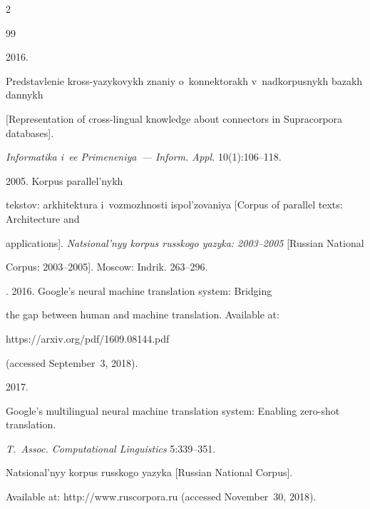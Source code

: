 \begin{multicols}{2}
{{\begin{thebibliography}{99}


 2016. 


Predstavlenie kross-yazykovykh znaniy o~konnektorakh v~nadkorpusnykh bazakh dannykh 


[Representation of cross-lingual knowledge about connectors in Supracorpora databases]. 


\textit{Informatika i~ee Primeneniya~--- Inform. Appl.} 10(1):106--118.




 2005. Korpus parallel'nykh 


tekstov: arkhitektura i~voz\-mozh\-nosti ispol'zovaniya [Corpus of parallel texts: Architecture and 


applications]. \textit{Natsional'nyy korpus russkogo yazyka: 2003--2005} [Russian National 


Corpus: 2003--2005]. Moscow: Indrik. 263--296.




. 2016. Google's neural machine translation system: Bridging 


the gap between human and machine translation. Available at: {\sf 


https://arxiv.org/pdf/1609.08144.pdf} (accessed September~3, 2018).




 2017. 


Google's multilingual neural machine translation system: Enabling zero-shot translation. 


\textit{T.~Assoc. Computational Linguistics} 5:339--351.




Natsional'nyy korpus russkogo yazyka [Russian National Corpus]. 


Available at: {\sf http://www.ruscorpora.ru} (accessed November~30, 2018).





\end{thebibliography}}}
\end{multicols}
